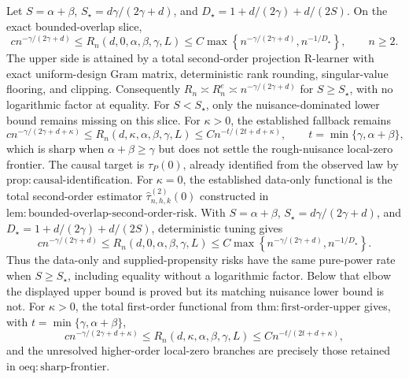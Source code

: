 Let \(S=\alpha+\beta\), \(S_\star=d\gamma/(2\gamma+d)\), and \(D_\star=1+d/(2\gamma)+d/(2S)\).  On the exact bounded-overlap slice,
\[
 c n^{-\gamma/(2\gamma+d)}
 \leq R_n(d,0,\alpha,\beta,\gamma,L)
 \leq C\max\left\{n^{-\gamma/(2\gamma+d)},n^{-1/D_\star}\right\},
 \qquad n\geq2.
\]
The upper side is attained by a total second-order projection R-learner with exact uniform-design Gram matrix, deterministic rank rounding, singular-value flooring, and clipping.  Consequently \(R_n\asymp R_n^e\asymp n^{-\gamma/(2\gamma+d)}\) for \(S\geq S_\star\), with no logarithmic factor at equality.  For \(S<S_\star\), only the nuisance-dominated lower bound remains missing on this slice.  For \(\kappa>0\), the established fallback remains
\[
 c n^{-\gamma/(2\gamma+d+\kappa)}
 \leq R_n(d,\kappa,\alpha,\beta,\gamma,L)
 \leq C n^{-t/(2t+d+\kappa)},
 \qquad t=\min\{\gamma,\alpha+\beta\},
\]
which is sharp when \(\alpha+\beta\geq\gamma\) but does not settle the rough-nuisance local-zero frontier.
The causal target is \(\tau_P(0)\), already identified from the observed law by \(\mathrm{prop:causal\mbox{-}identification}\).  For \(\kappa=0\), the established data-only functional is the total second-order estimator \(\widehat\tau^{(2)}_{n,h,k}(0)\) constructed in \(\mathrm{lem:bounded\mbox{-}overlap\mbox{-}second\mbox{-}order\mbox{-}risk}\).  With \(S=\alpha+\beta\), \(S_\star=d\gamma/(2\gamma+d)\), and \(D_\star=1+d/(2\gamma)+d/(2S)\), deterministic tuning gives
\[
 c n^{-\gamma/(2\gamma+d)}
 \leq R_n(d,0,\alpha,\beta,\gamma,L)
 \leq C\max\left\{n^{-\gamma/(2\gamma+d)},n^{-1/D_\star}\right\}.
\]
Thus the data-only and supplied-propensity risks have the same pure-power rate when \(S\geq S_\star\), including equality without a logarithmic factor.  Below that elbow the displayed upper bound is proved but its matching nuisance lower bound is not.  For \(\kappa>0\), the total first-order functional from \(\mathrm{thm:first\mbox{-}order\mbox{-}upper}\) gives, with \(t=\min\{\gamma,\alpha+\beta\}\),
\[
 c n^{-\gamma/(2\gamma+d+\kappa)}
 \leq R_n(d,\kappa,\alpha,\beta,\gamma,L)
 \leq C n^{-t/(2t+d+\kappa)},
\]
and the unresolved higher-order local-zero branches are precisely those retained in \(\mathrm{oeq:sharp\mbox{-}frontier}\).
